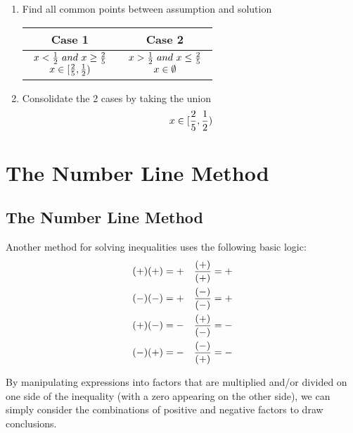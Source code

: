\begin{exercise}
\begin{enumerate}
		\item
		      Find all common points between assumption and solution \\
		      \begin{table}[H]
			      \centering
			      \begin{tabular}{|c|c|} \hline
				      \textbf{Case 1} & \textbf{Case 2}                \\ \hline
				      $ \begin{array}{ccc} x < {1 \over 2} \ and \ x \ge {2 \over 5} \\ x \in [{2 \over 5}, {1 \over 2}) \end{array} $
				                      & $ \begin{array}{ccc} x > {1 \over 2} \ and \ x \le {2 \over 5} \\ x \in \emptyset \end{array} $ \\ \hline
			      \end{tabular}
		      \end{table}

		\item
		      Consolidate the 2 cases by taking the union \\
		      $$
			      x \in [{2 \over 5}, {1 \over 2})
		      $$
	\end{enumerate}
\end{exercise}

\newpage

\section{The Number Line Method}

\subsection{The Number Line Method}

Another method for solving inequalities uses the following basic logic: \\

\nonumber
\begin{align}
	(+)(+) = + &  & {(+) \over (+)} = + \\
	(-)(-) = + &  & {(-) \over (-)} = + \\
	(+)(-) = - &  & {(+) \over (-)} = - \\
	(-)(+) = - &  & {(-) \over (+)} = -
\end{align}

By manipulating expressions into factors that are multiplied and/or divided on one side of the inequality (with a zero appearing on the other side), we can simply consider the combinations of positive and negative factors to draw conclusions. \\

